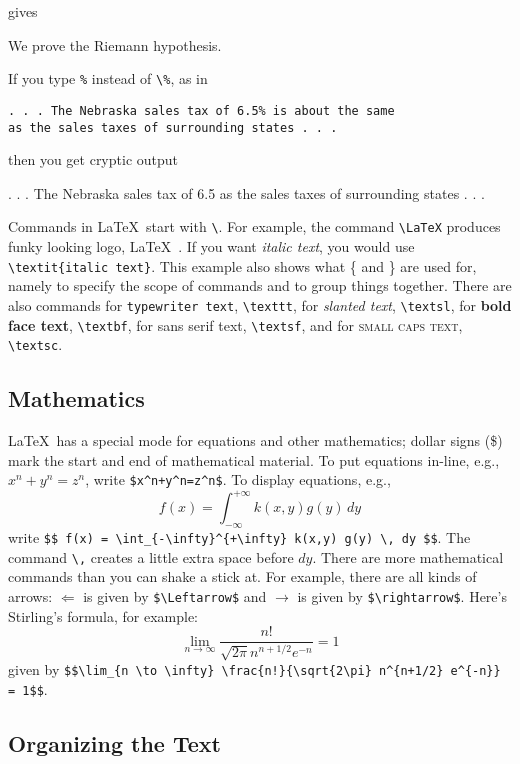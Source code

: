 \documentclass[12pt]{article}
\newcommand{\latex}{\LaTeX\ }
\begin{document}
gives

\bigskip
We prove the Riemann hypothesis.

\bigskip

If you type \verb+%+ instead of \verb+\%+, as in

\begin{verbatim}
. . . The Nebraska sales tax of 6.5% is about the same
as the sales taxes of surrounding states . . . 
\end{verbatim}

then you get cryptic output

\bigskip
. . . The Nebraska sales tax of 6.5%
as the sales taxes of surrounding states . . .
\bigskip

Commands in \latex start with \verb+\+.
For example, the command \verb+\LaTeX+ produces funky looking logo, \latex.
If you want \textit{italic text}, you would use
\verb+\textit{italic text}+.
This example also shows what \{ and \} are used for, namely to specify
the scope of commands and to group things together.
There are also commands for \texttt{typewriter text}, \verb+\texttt+,
for \textsl{slanted text}, \verb+\textsl+, for \textbf{bold face text},
\verb+\textbf+, for \textsf{sans serif text}, \verb+\textsf+, and
for \textsc{small caps text}, \verb+\textsc+.

\subsection{Mathematics}

\latex has a special mode for equations and other mathematics;
dollar signs (\$) mark the start and end of mathematical material.
To put equations in-line, e.g., $x^n+y^n=z^n$, write
\verb~$x^n+y^n=z^n$~.
To display equations, e.g.,
$$ f(x) = \int_{-\infty}^{+\infty} k(x,y) g(y) \, dy $$
write
\verb~$$ f(x) = \int_{-\infty}^{+\infty} k(x,y) g(y) \, dy $$~.
The command \verb~\,~ creates a little extra space before $dy$.
There are more mathematical commands than you can shake a stick at.
For example, there are all kinds of arrows: $\Leftarrow$ is given by
\verb+$\Leftarrow$+ and $\rightarrow$ is given by \verb~$\rightarrow$~.
Here's Stirling's formula, for example:
$$ \lim_{n \to \infty} \frac{n!}{\sqrt{2\pi} n^{n+1/2} e^{-n}} = 1 $$
given by
\verb~$$\lim_{n \to \infty} \frac{n!}{\sqrt{2\pi} n^{n+1/2} e^{-n}} = 1$$~.

\subsection{Organizing the Text}
\end{document}
